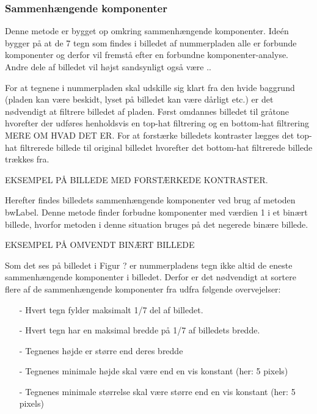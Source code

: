 \subsubsection{Sammenhængende komponenter}

Denne metode er bygget op omkring sammenhængende komponenter. Ideén bygger på at de 7 tegn som findes i billedet af nummerpladen alle er forbunde komponenter og derfor vil fremstå efter en forbundne komponenter-analyse. Andre dele af billedet vil højst sandsynligt også være ..



For at tegnene i nummerpladen skal udskille sig klart fra den hvide baggrund (pladen kan være beskidt, lyset på billedet kan være dårligt etc.) er det nødvendigt at filtrere billedet af pladen. Først omdannes billedet til gråtone hvorefter der udføres henholdsvis en top-hat filtrering og en bottom-hat filtrering MERE OM HVAD DET ER. For at forstærke billedets kontraster lægges det top-hat filtrerede billede til original billedet hvorefter det bottom-hat filtrerede billede trækkes fra.

EKSEMPEL PÅ BILLEDE MED FORSTÆRKEDE KONTRASTER.

Herefter findes billedets sammenhængende komponenter ved brug af metoden bwLabel. Denne metode finder forbudne komponenter med værdien 1 i et binært billede, hvorfor metoden i denne situation bruges på det negerede binære billede.

EKSEMPEL PÅ OMVENDT BINÆRT BILLEDE

Som det ses på billedet i Figur ? er nummerpladens tegn ikke altid de eneste sammenhængende komponenter i billedet. Derfor er det nødvendigt at sortere flere af de sammenhængende komponenter fra udfra følgende overvejelser:

\begin{itemize}
\item[-] Hvert tegn fylder maksimalt 1/7 del af billedet.
\item[-] Hvert tegn har en maksimal bredde på 1/7 af billedets bredde.
\item[-] Tegnenes højde er større end deres bredde
\item[-] Tegnenes minimale højde skal være end en vis konstant (her: 5 pixels)
\item[-] Tegnenes minimale størrelse skal være større end en vis konstant (her: 5 pixels)
\end{itemize}

